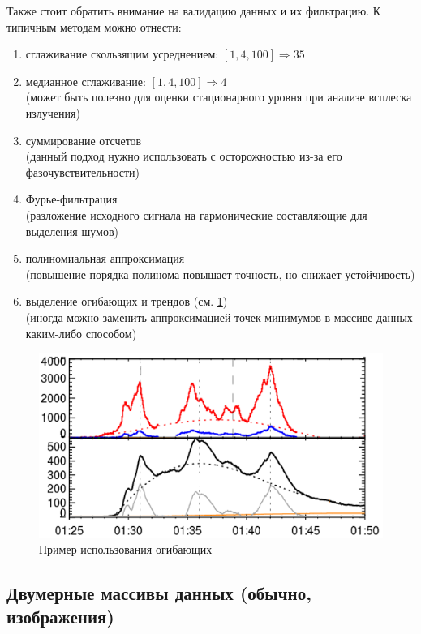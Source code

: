 Также стоит обратить внимание на валидацию данных и их фильтрацию. К типичным методам можно отнести:
\begin{enumerate}
	\item сглаживание скользящим усреднением: $[1, 4, 100] \Rightarrow 35$
	\item медианное сглаживание: $[1, 4, 100] \Rightarrow 4$\\
	(может быть полезно для оценки стационарного уровня при анализе всплеска излучения)
	\item суммирование отсчетов\\
	(данный подход нужно использовать с осторожностью из-за его фазочувствительности)
	\item Фурье-фильтрация\\
	(разложение исходного сигнала на гармонические составляющие для выделения шумов)
	\item полиномиальная аппроксимация\\
	(повышение порядка полинома повышает точность, но снижает устойчивость)
	\item выделение огибающих и трендов (см. \cref{grechnev4})\\
	(иногда можно заменить аппроксимацией точек минимумов в массиве данных каким-либо способом)
\end{enumerate}

\begin{figure}[h!]
	\centering
	\includegraphics[width=0.65\linewidth]{images/grechnev4.png}
	\caption{Пример использования огибающих}
	\label{grechnev4}
\end{figure}

\subsection{Двумерные массивы данных (обычно, изображения)}

